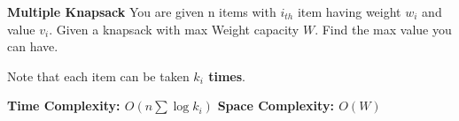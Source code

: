 \textbf{Multiple Knapsack}
You are given n items with $i_{th}$ item having weight  $w_i$ and value $v_i$. Given a knapsack with max Weight capacity $W$. Find the max value you can have.

Note that each item can be taken \textbf{$k_i$ times}.

\textbf{Time Complexity: $O(n \sum \log k_i)$}
\textbf{Space Complexity: $O(W)$}

